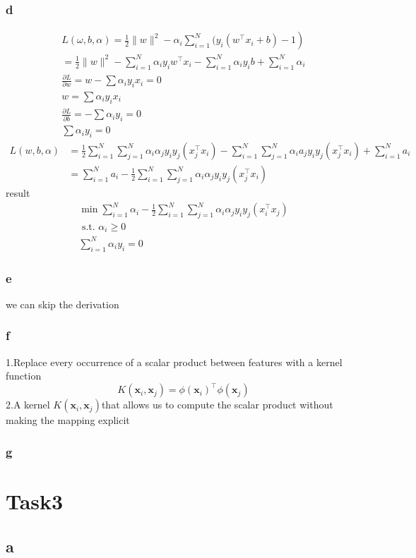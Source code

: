 \documentclass{article}
\begin{document}
\subsubsection{d}
$$\begin{array}{c}
\left.L(\omega, b, \alpha)=\frac{1}{2}\|w\|^{2}-\alpha_{i} \sum_{i=1}^{N} ( y_{i}\left(w^{\top} x_{i}+b\right)-1\right) \\
=\frac{1}{2}\|w\|^{2}-\sum_{i=1}^{N} \alpha_{i} y_{i} w^{\top} x_{i}-\sum_{i=1}^{N} \alpha_{i} y_i b+\sum_{i=1}^{N} \alpha_{i} \\
\frac{\partial L}{\partial w}=w-\sum \alpha_{i} y_{i} x_{i}=0 \\
w=\sum \alpha_{i} y_{i} x_{i} \\
\frac{\partial L}{\partial b}=-\sum \alpha_{i} y_{i}=0 \\
\sum \alpha_{i} y_{i}=0
\end{array}$$
$$\begin{aligned}
L(w, b, \alpha) &=\frac{1}{2} \sum_{i=1}^{N} \sum_{j=1}^{N} \alpha_{i} \alpha_{j} y_{i} y_{j}\left(x_{j}^{\top} x_{i}\right)-\sum_{i=1}^{N} \sum_{j=1}^{N} \alpha_{i} a_{j} y_{i} y_{j}\left(x_{j}^{\top} x_{i}\right)+\sum_{i=1}^{N} a_{i} \\
&=\sum_{i=1}^{N} a_{i}-\frac{1}{2} \sum_{i=1}^{N} \sum_{j=1}^{N} \alpha_{i} \alpha_{j} y_{i} y_{j}\left(x_{j}^{\top} x_{i}\right)
\end{aligned}$$
result
$$\begin{aligned}
\min \sum_{i=1}^{N} \alpha_{i}-\frac{1}{2} \sum_{i=1}^{N} \sum_{j=1}^{N} \alpha_{i} \alpha_{j} y_{i} y_{j}\left(x_{i}^{\top} x_{j}\right) \\
\text { s.t. } \alpha_{i} \geqslant 0 \\
\sum_{i=1}^{N} \alpha_{i} y_{i}=0
\end{aligned}$$
\subsubsection{e}
we can skip the derivation
\subsubsection{f}
1.Replace every occurrence of a scalar product between features with a kernel function
$$K\left(\mathbf{x}_{i}, \mathbf{x}_{j}\right)=\phi\left(\mathbf{x}_{i}\right)^{\top} \phi\left(\mathbf{x}_{j}\right)$$
2.A kernel $K\left(\mathbf{x}_{i}, \mathbf{x}_{j}\right)$that allows us to compute the
scalar product without making the mapping explicit
\subsubsection{g}

\section{Task3}
\subsection{a}
\end{document}
